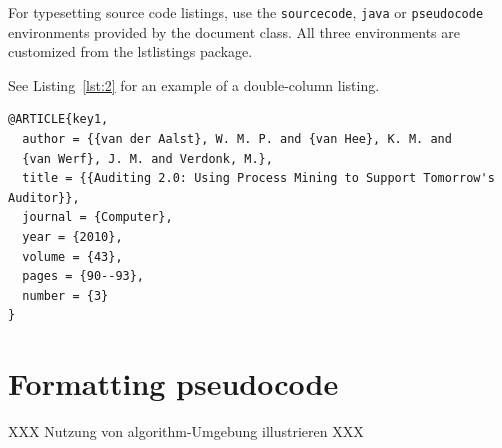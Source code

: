 \documentclass[british]{emisa}
\begin{document}
\begin{article}
For typesetting source code listings, use the \verb|sourcecode|, \verb|java| or \verb|pseudocode| environments provided by the document class. All three environments are customized from the lstlistings package. 

See Listing~\ref{lst:2} for an example of a double-column listing.

\begin{lstlisting}[float=*htbp,caption={Enter your double-column listing caption here. Note that the listing width is too wide. Correct by entering a newline before, \eg, 'Tomorrow'.},label={lst:2}]
@ARTICLE{key1,
  author = {{van der Aalst}, W. M. P. and {van Hee}, K. M. and 
  {van Werf}, J. M. and Verdonk, M.},
  title = {{Auditing 2.0: Using Process Mining to Support Tomorrow's Auditor}},
  journal = {Computer},
  year = {2010},
  volume = {43},
  pages = {90--93},
  number = {3}
}
\end{lstlisting}



\section{Formatting pseudocode}\label{sec:algorithm}
XXX Nutzung von algorithm-Umgebung illustrieren XXX 



%



\end{article}
\end{document}
